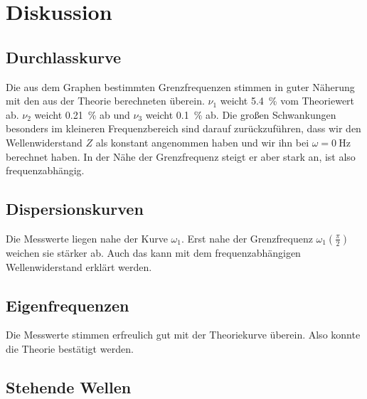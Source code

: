 \section{Diskussion}
\label{sec:Diskussion}

\subsection{Durchlasskurve}

Die aus dem Graphen bestimmten Grenzfrequenzen stimmen in guter Näherung mit
den aus der Theorie berechneten überein. $\nu_1$ weicht \SI{5.4}{\percent} vom
Theoriewert ab. $\nu_2$ weicht \SI{0.21}{\percent} ab und $\nu_3$ weicht \SI{0.1}{\percent}
ab. Die großen Schwankungen besonders im kleineren Frequenzbereich sind darauf
zurückzuführen, dass wir den Wellenwiderstand $Z$ als konstant angenommen haben und
wir ihn bei $\omega = \SI{0}{\hertz}$ berechnet haben. In der Nähe der Grenzfrequenz
steigt er aber stark an, ist also frequenzabhängig.

\subsection{Dispersionskurven}

Die Messwerte liegen nahe der Kurve $\omega_1$. Erst nahe der Grenzfrequenz
$\omega_1(\frac{\pi}{2})$ weichen sie stärker ab. Auch das kann mit dem
frequenzabhängigen Wellenwiderstand erklärt werden.

\subsection{Eigenfrequenzen}

Die Messwerte stimmen erfreulich gut mit der Theoriekurve überein. Also konnte die
Theorie bestätigt werden.

\subsection{Stehende Wellen}
